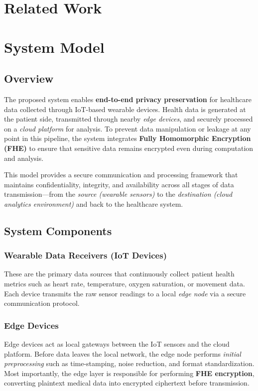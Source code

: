 \documentclass[review]{elsarticle}
\begin{document}
\section{Related Work}

\section{System Model}

\subsection{Overview}
The proposed system enables \textbf{end-to-end privacy preservation} for healthcare data collected through IoT-based wearable devices. Health data is generated at the patient side, transmitted through nearby \textit{edge devices}, and securely processed on a \textit{cloud platform} for analysis. To prevent data manipulation or leakage at any point in this pipeline, the system integrates \textbf{Fully Homomorphic Encryption (FHE)} to ensure that sensitive data remains encrypted even during computation and analysis.

This model provides a secure communication and processing framework that maintains confidentiality, integrity, and availability across all stages of data transmission---from the \textit{source (wearable sensors)} to the \textit{destination (cloud analytics environment)} and back to the healthcare system.

\subsection{System Components}

\subsubsection{Wearable Data Receivers (IoT Devices)}
These are the primary data sources that continuously collect patient health metrics such as heart rate, temperature, oxygen saturation, or movement data. Each device transmits the raw sensor readings to a local \textit{edge node} via a secure communication protocol.

\subsubsection{Edge Devices}
Edge devices act as local gateways between the IoT sensors and the cloud platform. Before data leaves the local network, the edge node performs \textit{initial preprocessing} such as time-stamping, noise reduction, and format standardization. Most importantly, the edge layer is responsible for performing \textbf{FHE encryption}, converting plaintext medical data into encrypted ciphertext before transmission.
\end{document}
